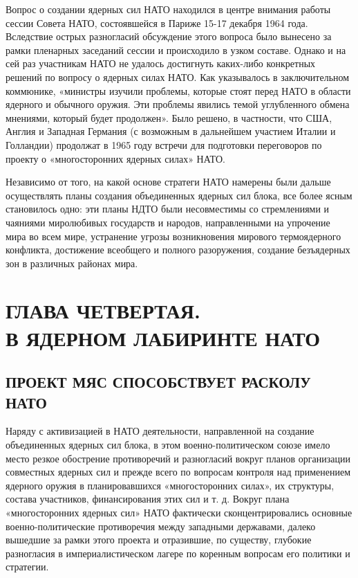\documentclass[12pt, a4paper, openany]{book}
\begin{document}
		Вопрос о создании ядерных сил НАТО находился в центре внимания работы сессии Совета НАТО, состоявшейся в Париже 15-17 декабря 1964 года. Вследствие острых разногласий обсуждение этого вопроса было вынесено за рамки пленарных заседаний сессии и происходило в узком составе. Однако и на сей раз участникам НАТО не удалось достигнуть каких-либо конкретных решений по вопросу о ядерных силах НАТО. Как указывалось в заключительном коммюнике, «министры изучили проблемы, которые стоят перед НАТО в области ядерного и обычного оружия. Эти проблемы явились темой углубленного обмена мнениями, который будет продолжен». Было решено, в частности, что США, Англия и Западная Германия (с возможным в дальнейшем участием Италии и Голландии) продолжат в 1965 году встречи для подготовки переговоров по проекту о «многосторонних ядерных силах» НАТО.
		
		Независимо от того, на какой основе стратеги НАТО намерены были дальше осуществлять планы создания объединенных ядерных сил блока, все более ясным становилось одно: эти планы НДТО были несовместимы со стремлениями и чаяниями миролюбивых государств и народов, направленными на упрочение мира во всем мире, устранение угрозы возникновения мирового термоядерного конфликта, достижение всеобщего и полного разоружения, создание безъядерных зон в различных районах мира.
		
		\newpage
		\section[Глава четвертая. В ЯДЕРНОМ ЛАБИРИНТЕ НАТО]{\center ГЛАВА ЧЕТВЕРТАЯ.\\ \textbf{В ЯДЕРНОМ ЛАБИРИНТЕ НАТО}}	
		\subsection[Проект МЯС способствует расколу НАТО]{\center ПРОЕКТ МЯС СПОСОБСТВУЕТ РАСКОЛУ НАТО}	
		
		Наряду с активизацией в НАТО деятельности, направленной на создание объединенных ядерных сил блока, в этом военно-политическом союзе имело место резкое обострение противоречий и разногласий вокруг планов организации совместных ядерных сил и прежде всего по вопросам контроля над применением ядерного оружия в планировавшихся «многосторонних силах», их структуры, состава участников, финансирования этих сил и т. д. Вокруг плана «многосторонних ядерных сил» НАТО фактически сконцентрировались основные военно-политические противоречия между западными державами, далеко вышедшие за рамки этого проекта и отразившие, по существу, глубокие разногласия в империалистическом лагере по коренным вопросам его политики и стратегии.
		
\end{document}
